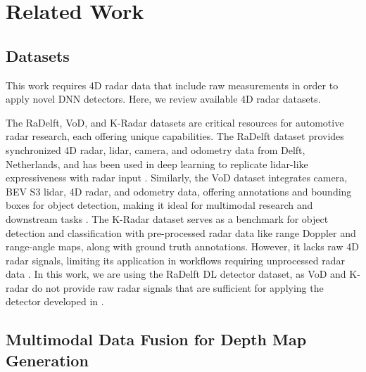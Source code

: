 \section{Related Work}


\subsection{Datasets}
This work requires 4D radar data that include raw measurements in order to apply novel DNN detectors. Here, we review available 4D radar datasets.

The RaDelft, VoD, and K-Radar datasets are critical resources for automotive radar research, each offering unique capabilities. The RaDelft dataset provides synchronized 4D radar, lidar, camera, and odometry data from Delft, Netherlands, and has been used in deep learning to replicate lidar-like expressiveness with radar input \cite{roldan2024see}. Similarly, the VoD dataset integrates camera, BEV S3 lidar, 4D radar, and odometry data, offering annotations and bounding boxes for object detection, making it ideal for multimodal research and downstream tasks \cite{VoD}. The K-Radar dataset serves as a benchmark for object detection and classification with pre-processed radar data like range Doppler and range-angle maps, along with ground truth annotations. However, it lacks raw 4D radar signals, limiting its application in workflows requiring unprocessed radar data \cite{kradar}. In this work, we are using the RaDelft DL detector dataset, as VoD and K-radar do not provide raw radar signals that are sufficient for applying the detector developed in \cite{roldan2024see}.


\subsection{Multimodal Data Fusion for Depth Map Generation}

